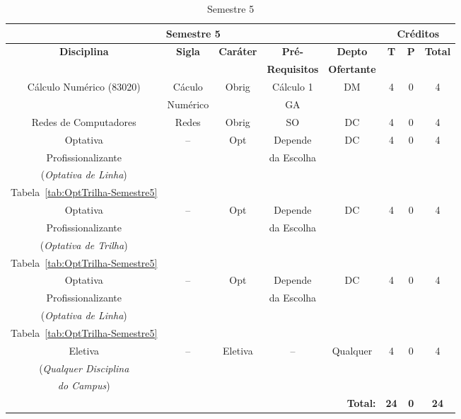 \begin{table}[H]
\caption{Semestre 5}
\centering
\footnotesize
\begin{tabular}{|c|c|c|c|c|c|c|c|} %
\hline
\hline
\multicolumn{5}{|c|}{\textbf{Semestre 5}}  &  \multicolumn{3}{|c|}{\textbf{Créditos}} \\
\hline
\hline
\textbf{Disciplina} & \textbf{Sigla} & \textbf{Caráter} & \textbf{Pré-} & \textbf{Depto} &  \textbf{T}  &  \textbf{P}  & \textbf{Total} \\ 
& & & \textbf{Requisitos}  & \textbf{Ofertante} & & & \\
\hline 

Cálculo Numérico (83020) & Cáculo & Obrig & Cálculo 1 & DM & 4 & 0 & 4 \\
& Numérico & & GA & & & & \\
\hline

Redes de Computadores & Redes & Obrig & SO & DC & 4 & 0 & 4 \\
\hline

Optativa & --  & Opt & Depende & DC  & 4 & 0 & 4 \\
Profissionalizante & & & da Escolha & & & & \\
(\textit{Optativa de Linha}) & & & & & & & \\
Tabela~\ref{tab:OptTrilha-Semestre5} & & & & & & & \\
\hline

Optativa & --  & Opt & Depende & DC  & 4 & 0 & 4 \\
Profissionalizante & & & da Escolha & & & & \\
(\textit{Optativa de Trilha}) & & & & & & & \\
Tabela~\ref{tab:OptTrilha-Semestre5} & & & & & & & \\
\hline


Optativa & --  & Opt & Depende & DC  & 4 & 0 & 4 \\
Profissionalizante & & & da Escolha & & & & \\
(\textit{Optativa de Linha}) & & & & & & & \\
Tabela~\ref{tab:OptTrilha-Semestre5} & & & & & & & \\
\hline

Eletiva  & --  & Eletiva & -- & Qualquer & 4 & 0 & 4 \\
(\textit{Qualquer Disciplina} & & & & & & & \\
\textit{do Campus}) & & & & & & & \\
\hline




\hline


\hline
\hline
\multicolumn{5}{|r|}{\textbf{Total:}}  &  \textbf{24}  &  \textbf{0}   & \textbf{24} \\ %
\hline
\hline
\end{tabular}
\label{tab:matriz5}
\end{table}



